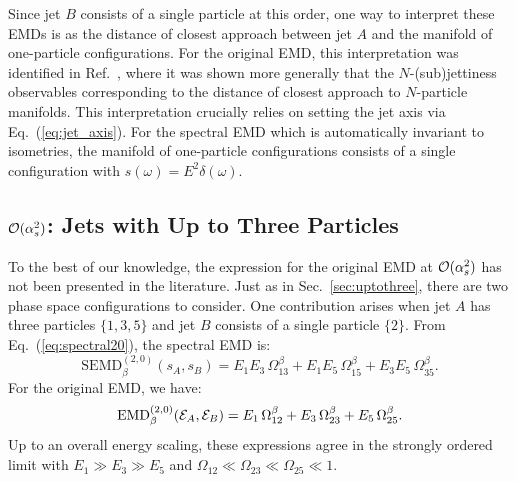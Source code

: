 \documentclass[letterpaper,11pt]{article}
\DeclareRobustCommand{\Sec}[1]{Sec.~\ref{#1}}
\DeclareRobustCommand{\Eq}[1]{Eq.~(\ref{#1})}
\DeclareRobustCommand{\InRef}[1]{Ref.~\cite{#1}}
\begin{document}
Since jet $B$ consists of a single particle at this order, one way to interpret these EMDs is as the distance of closest approach between jet $A$ and the manifold of one-particle configurations.
%
For the original EMD, this interpretation was identified in \InRef{Komiske:2020qhg}, where it was shown more generally that the $N$-(sub)jettiness observables \cite{Brandt:1978zm,Stewart:2010tn,Thaler:2010tr,Kim:2010uj,Thaler:2011gf} corresponding to the distance of closest approach to $N$-particle manifolds.
%
This interpretation crucially relies on setting the jet axis via \Eq{eq:jet_axis}.
%
For the spectral EMD which is automatically invariant to isometries, the manifold of one-particle configurations consists of a single configuration with $s(\omega) = E^2 \delta(\omega)$.






\subsection{${\cal O}(\alpha_s^2)$: Jets with Up to Three Particles}


To the best of our knowledge, the expression for the original EMD at ${\cal O}(\alpha_s^2)$ has not been presented in the literature.
%
Just as in \Sec{sec:uptothree}, there are two phase space configurations to consider.
%
One contribution arises when jet $A$ has three particles $\{1,3,5\}$ and jet $B$ consists of a single particle $\{2\}$.
%
From \Eq{eq:spectral20}, the spectral EMD is:
%
\begin{equation}
\text{SEMD}^{(2,0)}_\beta(s_A, s_B)= E_1 E_3 \, \Omega_{13}^\beta+E_1E_5 \, \Omega_{15}^\beta +E_3E_5 \, \Omega_{35}^\beta.
\end{equation}
%
For the original EMD, we have:
%
\begin{align}
\text{EMD}^{(2,0)}_{\beta}({\cal E}_A,{\cal E}_B)= E_1\,\Omega_{12}^\beta+E_3\, \Omega_{23}^\beta + E_5\, \Omega_{25}^\beta.
\end{align}
%
Up to an overall energy scaling, these expressions agree in the strongly ordered limit with $E_1 \gg E_3 \gg E_5$ and $\Omega_{12} \ll \Omega_{23} \ll \Omega_{25}\ll 1$.
\end{document}
